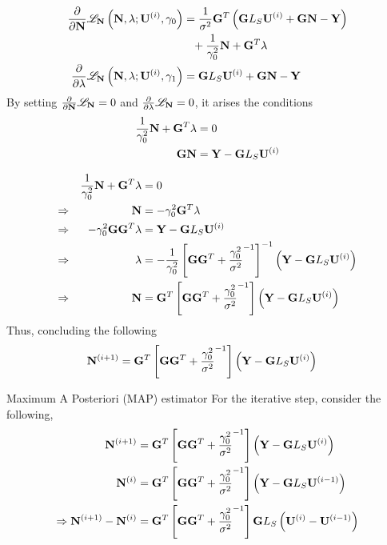 \documentclass[progressbar=head]{beamer}
\begin{document}
\begin{frame}
\begin{align*}
\frac{\partial}{\partial \mathbf{N}}
\mathscr{L}_{\mathbf{N}} \left( \mathbf{N}, \lambda; \mathbf{U}^{(i)}, \gamma_0 \right)
    &=
    \frac{1}{\sigma^2}
    \mathbf{G}^T
    \left( \mathbf{G} L_S \mathbf{U}^{(i)} + \mathbf{G} \mathbf{N} - \mathbf{Y} \right)
    \\
    &\phantom{=}
    +
    \frac{1}{\gamma_0^2} {\mathbf{N}}
    +
    \mathbf{G}^T \lambda
    \\
    \frac{\partial}{\partial \lambda} 
    \mathscr{L}_{\mathbf{N}} \left( \mathbf{N}, \lambda; \mathbf{U}^{(i)}, \gamma_1 \right)
    &=
    \mathbf{G} L_S \mathbf{U}^{(i)} + \mathbf{G} \mathbf{N} - \mathbf{Y}
\end{align*}
By setting $\frac{\partial}{\partial \mathbf{N}} \mathscr{L}_{\mathbf{N}} = 0$ and 
$\frac{\partial}{\partial \lambda} \mathscr{L}_{\mathbf{N}} = 0$, it arises the conditions
\begin{align*}
    {\frac{1}{\gamma_0^2} { \mathbf{N}}
    +
    \mathbf{G}^T \lambda} &= 0
    \\
    \mathbf{G} \mathbf{N} 
    &= \mathbf{Y} - \mathbf{G} L_S \mathbf{U}^{(i)} 
\end{align*}
\end{frame}

\begin{frame}
\begin{align*}
&&
{\frac{1}{\gamma_0^2} { \mathbf{N}}
    +
    \mathbf{G}^T \lambda} &= 0
\\
\Rightarrow
&&
\mathbf{N} &= -\gamma_0^2 \mathbf{G}^T \lambda
\\
\Rightarrow
&&
-\gamma_0^2 \mathbf{G} \mathbf{G}^T \lambda
&=
\mathbf{Y} - \mathbf{G} L_S \mathbf{U}^{(i)} 
\\
\Rightarrow
&&
\lambda &=
-\frac{1}{\gamma_0^2} \left[ \mathbf{G} \mathbf{G}^T+ \frac{\gamma_0^2}{\sigma^2}^{-1} \right]^{-1} \left( \mathbf{Y} - \mathbf{G} L_S \mathbf{U}^{(i)}  \right)
\\
\Rightarrow
&&
\mathbf{N} &=
\mathbf{G}^T \left[ \mathbf{G} \mathbf{G}^T+ \frac{\gamma_0^2}{\sigma^2}^{-1} \right] \left( \mathbf{Y} - \mathbf{G} L_S \mathbf{U}^{(i)}  \right)
\end{align*}
Thus, concluding the following
\begin{align*}
\mathbf{N}^{(i+1)} &=
\mathbf{G}^T \left[ \mathbf{G} \mathbf{G}^T+ \frac{\gamma_0^2}{\sigma^2}^{-1} \right] \left( \mathbf{Y} - \mathbf{G} L_S \mathbf{U}^{(i)}  \right)
\end{align*}
\end{frame}

\begin{frame}{Maximum A Posteriori (MAP) estimator}
For the iterative step, consider the following,
\begin{align*}
\mathbf{N}^{(i+1)} &=
\mathbf{G}^T \left[ \mathbf{G} \mathbf{G}^T+ \frac{\gamma_0^2}{\sigma^2}^{-1} \right] \left( \mathbf{Y} - \mathbf{G} L_S \mathbf{U}^{(i)}  \right)
\\
\mathbf{N}^{(i)} &=
\mathbf{G}^T \left[ \mathbf{G} \mathbf{G}^T+ \frac{\gamma_0^2}{\sigma^2}^{-1} \right] \left( \mathbf{Y} - \mathbf{G} L_S \mathbf{U}^{(i-1)}  \right)
\\
\Rightarrow
\mathbf{N}^{(i+1)}-\mathbf{N}^{(i)} &=
\mathbf{G}^T \left[ \mathbf{G} \mathbf{G}^T+ \frac{\gamma_0^2}{\sigma^2}^{-1} \right] \mathbf{G} L_S \left(  \mathbf{U}^{(i)}-\mathbf{U}^{(i-1)}  \right)
\end{align*}
\end{frame}
\end{document}
